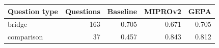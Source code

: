 \begin{tabular}{lrrrr}
\hline
Question type & Questions & Baseline & MIPROv2 & GEPA \\ \hline
bridge & 163 & 0.705 & 0.671 & 0.705 \\
comparison & 37 & 0.457 & 0.843 & 0.812 \\
\hline
\end{tabular}
